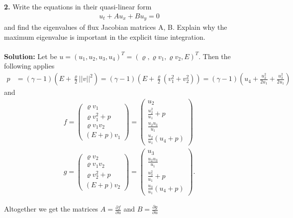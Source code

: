 \documentclass[11pt]{scrartcl}
\begin{document}
\textbf{2.} Write the equations in their quasi-linear form
\begin{align*}
	u_t+Au_x + Bu_y =0 
\end{align*}
and find the eigenvalues of flux Jacobian matrices A, B. Explain why
the maximum eigenvalue is important in the explicit time integration.
\\
\\
\textbf{Solution:}
Let be $u=(u_1,u_2,u_3,u_4)^T=(\varrho , \varrho v_1, \varrho v_2, E)^T$. Then the following applies
\begin{align*}
	p&=(\gamma -1)(E+\frac{\varrho}{2} ||v||^2)
	=(\gamma -1)(E+\frac{\varrho}{2} (v_1^2+v_2^2))
	=(\gamma -1)(u_4+ \frac{u_2^2}{2 u_1}+\frac{u_3^2}{2 u_1} )
\end{align*}
and
\begin{align*}
	f=\left(\begin{array}{c} \varrho v_1 \\ \varrho v_1^2 + p \\ \varrho v_1 v_2 \\ (E+p)v_1 \end{array}\right)= \left(\begin{array}{c} u_2 \\ \frac{u_2^2}{u_1} + p \\ \frac{u_2 u_3}{u_1} \\ \frac{u_2}{u_1} (u_4+p) \end{array}\right)\\
	g=\left(\begin{array}{c} \varrho v_2 \\ \varrho v_1 v_2 \\ \varrho v_2^2+p \\ (E+p)v_2 \end{array}\right)=
	\left(\begin{array}{c} u_3 \\ \frac{u_2 u_3}{u_1} \\ \frac{u_3^2}{u_1} + p \\ \frac{u_3}{u_1} (u_4+p) \end{array}\right).
\end{align*}

Altogether we get the matrices $A=\frac{\partial f}{\partial u}$ and $B=\frac{\partial g}{\partial u}$
\end{document}
